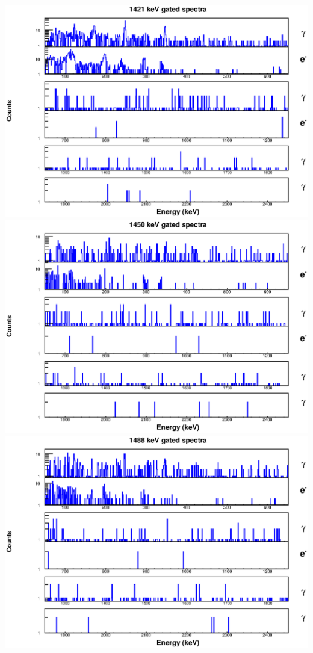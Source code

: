 \includegraphics[scale=0.8]{154Gd_Appendix/1421_combined.eps}
\includegraphics[scale=0.8]{154Gd_Appendix/1450_combined.eps}
\includegraphics[scale=0.8]{154Gd_Appendix/1488_combined.eps}
